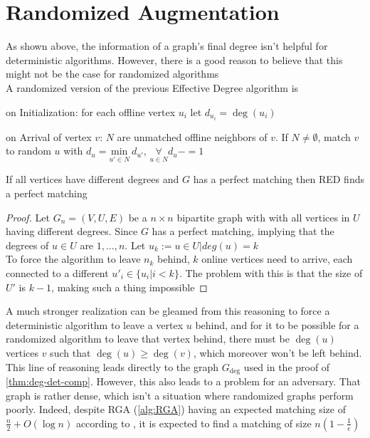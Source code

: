\section{Randomized Augmentation}
As shown above, the information of a graph's final degree isn't helpful for deterministic algorithms. However, there is a good reason to believe that this might not be the case for randomized algorithms\\
A randomized version of the previous Effective Degree algorithm is

\begin{algorithm}
	\caption{Randomized Effective Degree - RED}
	\label{alg:red}
	\begin{algorithmic}
		\item on Initialization: for each offline vertex $u_i$ let $d_{u_i}=\deg(u_i)$
		\item on Arrival of vertex $v$: $N$ are unmatched offline neighbors of $v$. If $N\neq\emptyset$, match $v$ to random $u$ with $d_u=\underset{u'\in N}{\mathrm{min}}\ d_{u'}$, $\underset{u\in N}{\forall}d_u-=1$
	\end{algorithmic}
\end{algorithm}

\begin{lemma}
\label{deg-diff-degree}
If all vertices have different degrees and $G$ has a perfect matching then RED finds a perfect matching
\end{lemma}

\begin{proof}
	Let $G_n=(V,U,E)$ be a $n\times n$ bipartite graph with with all vertices in $U$ having different degrees. Since $G$ has a perfect matching, implying that the degrees of $u\in U$ are $1,\dots,n$. Let $u_k:=u\in U|deg(u)=k$\\
	To force the algorithm to leave $n_k$ behind, $k$ online vertices need to arrive, each connected to a different $u'_i\in\{u_i|i<k\}$. The problem with this is that the size of $U'$ is $k-1$, making such a thing impossible
\end{proof}

A much stronger realization can be gleamed from this reasoning to force a deterministic algorithm to leave a vertex $u$ behind, and for it to be possible for a randomized algorithm to leave that vertex behind, there must be $\deg(u)$ vertices $v$ such that $\deg(u)\geq\deg(v)$, which moreover won't be left behind.\\

This line of reasoning leads directly to the graph $G_{\deg}$ used in the proof of \autoref{thm:deg-det-comp}. However, this also leads to a problem for an adversary. That graph is rather dense, which isn't a situation where randomized graphs perform poorly. Indeed, despite
RGA (\autoref{alg:RGA}) having an expected matching size of $\frac{n}{2}+O(\log n)$ according to \cite{karp}, it is expected to find a matching of size $n(1-\frac{1}{e})$

